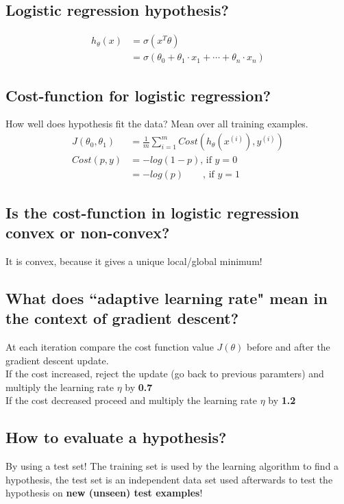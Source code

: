 \documentclass[12pt]{scrartcl}
\begin{document}
\subsection{Logistic regression hypothesis?}
\begin{align*}
h_\theta(x) &= \sigma(x^T\theta) \\
 &= \sigma(\theta_0+\theta_1 \cdot x_1 + \cdots + \theta_n \cdot x_n)
\end{align*}

\subsection{Cost-function for logistic regression?}
How well does hypothesis fit the data? Mean over all training examples.
\begin{align*}
J(\theta_0,\theta_1) &= \frac{1}{m} \sum_{i=1}^{m}Cost(h_\theta(x^{(i)}),y^{(i)}) \\
Cost(p,y) &= -log(1-p)\text{, if }y=0 \\
 &= -log(p) \qquad \text{, if }y=1
\end{align*}

\subsection{Is the cost-function in logistic regression convex or non-convex?}
It is convex, because it gives a unique local/global minimum!

\subsection{What does ``adaptive learning rate" mean in the context of gradient descent?}
At each iteration compare the cost function value $J(\theta)$ before and after the gradient descent update. \\
If the cost increased, reject the update (go back to previous paramters) and multiply the learning rate $\eta$ by {\bf 0.7} \\
If the cost decreased proceed and multiply the learning rate $\eta$ by {\bf 1.2}

\subsection{How to evaluate a hypothesis?}
\label{traintest}By using a test set! The training set is used by the learning algorithm to find a hypothesis, the test set is an independent data set used afterwards to test the hypothesis on {\bf new (unseen) test examples}!
\end{document}
